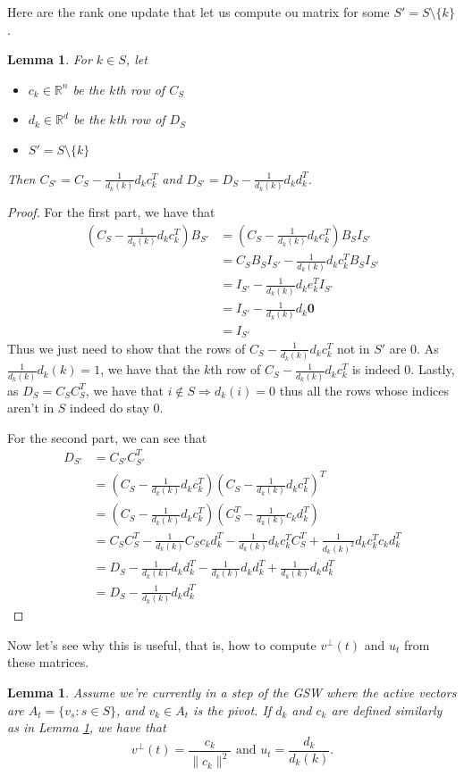 \documentclass[12pt]{article}
\newtheorem{lemma}[theorem]{Lemma}
\begin{document}
Here are the rank one update that let us compute ou matrix for some $S'=S\setminus\{k\}$.
\begin{lemma}\label{update_lemma}
For $k\in S$, let 
\begin{itemize}
\item $c_k\in\mathbb{R}^{n}$ be the $k$th row of $C_S$
\item $d_k\in\mathbb{R}^{d}$ be the $k$th row of $D_S$
\item $S'= S\setminus\{k\}$
\end{itemize}
Then $C_{S'}=C_S-\frac{1}{d_k(k)}d_kc_k^T$ and $D_{S'}=D_S-\frac{1}{d_k(k)}d_kd_k^T$.
\end{lemma}
\begin{proof}
For the first part, we have that\begin{align*}
\left(C_S-\frac{1}{d_k(k)}d_kc_k^T\right)B_{S'}&=\left(C_S-\frac{1}{d_k(k)}d_kc_k^T\right)B_{S}I_{S'}\\
&=C_SB_SI_{S'}-\frac{1}{d_k(k)}d_kc_k^TB_{S}I_{S'}\\
&=I_{S'}-\frac{1}{d_k(k)}d_ke_k^TI_{S'}\\
&=I_{S'}-\frac{1}{d_k(k)}d_k\textbf{0}\\
&=I_{S'}\end{align*}
Thus we just need to show that the rows of $C_S-\frac{1}{d_k(k)}d_kc_k^T$ not in $S'$ are 0. As $\frac{1}{d_k(k)}d_k(k)=1$, we have that the $k$th row of $C_S-\frac{1}{d_k(k)}d_kc_k^T$ is indeed 0. Lastly, as $D_S=C_SC_S^T$, we have that $i\not\in S\Rightarrow d_k(i)=0$ thus all the rows whose indices aren't in $S$ indeed do stay 0.

For the second part, we can see that \begin{align*}
D_{S'}&=C_{S'}C_{S'}^T\\
&=\left(C_S-\frac{1}{d_k(k)}d_kc_k^T\right)\left(C_S-\frac{1}{d_k(k)}d_kc_k^T\right)^T\\
&=\left(C_S-\frac{1}{d_k(k)}d_kc_k^T\right)\left(C_S^T-\frac{1}{d_k(k)}c_kd_k^T\right)\\
&=C_SC_S^T-\frac{1}{d_k(k)}C_Sc_kd_k^T-\frac{1}{d_k(k)}d_kc_k^TC_S^T+\frac{1}{d_k(k)^2}d_kc_k^Tc_kd_k^T\\
&=D_S-\frac{1}{d_k(k)}d_kd_k^T-\frac{1}{d_k(k)}d_kd_k^T+\frac{1}{d_k(k)}d_kd_k^T\\
&=D_S-\frac{1}{d_k(k)}d_kd_k^T\end{align*}\end{proof}
Now let's see why this is useful, that is, how to compute $v^\perp(t)$ and $u_t$ from these matrices.
\begin{lemma}
Assume we're currently in a step of the GSW where the active vectors are $A_t=\{v_s:s\in S\}$, and $v_k\in A_t$ is the pivot. If $d_k$ and $c_k$ are defined similarly as in Lemma \ref{update_lemma}, we have that $$v^\perp(t)=\frac{c_k}{\|c_k\|^2}\textrm{ and }u_t=\frac{d_k}{d_k(k)}.$$
\end{lemma}
\end{document}
